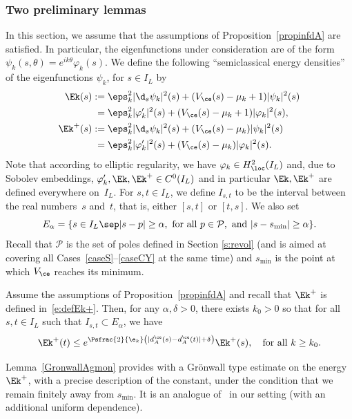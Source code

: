 \subsubsection{Two preliminary lemmas}
In this section, we assume that the assumptions of Proposition~\ref{propinfdA} are satisfied. In particular, the eigenfunctions under consideration are of the form $\psi_k(s, \theta) = e^{ik \theta}\varphi_k(s)$.
We define the following ``semiclassical energy densities'' of the eigenfunctions $\psi_k$, for $s \in I_L$ by
\begin{align}
\label{e:defEk}\Ek(s)&:= \eps_k^2 |\d_s \psi_k|^2(s)+ (V_\ce(s) -\mu_k+1)|\psi_k|^2(s) \\
& \phantom{:}= \eps_k^2 |\varphi_k'|^2(s)+ (V_\ce(s) -\mu_k+1)|\varphi_k|^2(s),\nonumber \\
\label{e:defEk+} \Ek^+(s)&:=\eps_k^2 |\d_s \psi_k|^2(s)+(V_\ce(s) -\mu_k)|\psi_k|^2(s) \\
& \phantom{:}=\eps_k^2 |\varphi_k'|^2(s)+(V_\ce(s) -\mu_k)|\varphi_k|^2(s). \nonumber
\end{align}
Note that according to elliptic regularity, we have $\varphi_k \in H^2_{\loc}(I_L)$ and, due to Sobolev embeddings, $\varphi_k', \Ek, \Ek^+ \in C^0(I_L)$ and in particular $\Ek, \Ek^+$ are defined everywhere on~$I_L$.
For $s, t \in I_L$, we define $I_{s,t}$ to be the interval between the real numbers~$s$ and~$t$, that is, either $[s,t]$ or $[t,s]$.
We also set
\begin{equation}
\label{e:def-E-alpha}
E_\alpha = \{ s \in I_L \sep |s-p| \geq \alpha, \text{ for all } p\in\mathcal{P}, \text{ and }|s-s_{\min}|\geq \alpha \}.
\end{equation}
Recall that $\mathcal{P}$ is the set of poles defined in Section \ref{s:revol} (and is aimed at covering all Cases~\ref{caseS}--\ref{caseCY}
at the same time) and $s_{\min}$ is the point at which $V_{\ce}$ reaches its minimum.
\begin{lemma}
\label{GronwallAgmon}
Assume the assumptions of Proposition~\ref{propinfdA} and recall that $\Ek^+$ is defined in~\eqref{e:defEk+}.
Then, for any $\alpha,\delta>0$, there exists $k_0>0$ so that for all $s,t \in I_L$ such that $I_{s,t} \subset E_\alpha$, we have
\[
\Ek^+(t)\leq e^{\Psfrac{2}{\e_k}\left(|d_A^{\ce}(s)-d_A^{\ce}(t)|+\delta\right)}\Ek^+(s), \quad \text{for all }k\geq k_0.
\]
\end{lemma}
Lemma~\ref{GronwallAgmon} provides with a Grönwall type estimate on the energy $\Ek^+$, with a precise description of the constant, under the condition that we remain finitely away from $s_{\min}$. It is an analogue of~\cite[Lem.\,12]{Allibert:98} in our setting (with an additional uniform dependence).

